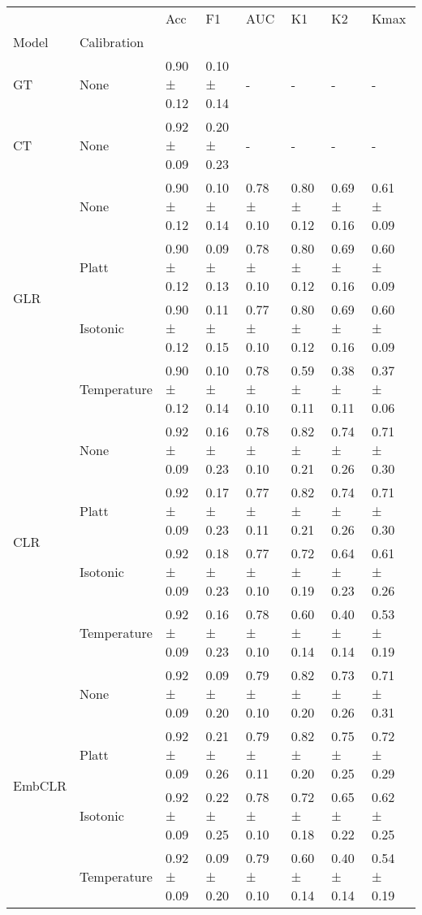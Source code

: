 \begin{tabular}{llllllll}
\toprule
 &  & Acc & F1 & AUC & K1 & K2 & Kmax \\
Model & Calibration &  &  &  &  &  &  \\
\midrule
GT & None & 0.90 ± 0.12 & 0.10 ± 0.14 & - & - & - & - \\
\cline{1-8}
CT & None & 0.92 ± 0.09 & 0.20 ± 0.23 & - & - & - & - \\
\cline{1-8}
\multirow[t]{4}{*}{GLR} & None & 0.90 ± 0.12 & 0.10 ± 0.14 & 0.78 ± 0.10 & 0.80 ± 0.12 & 0.69 ± 0.16 & 0.61 ± 0.09 \\
 & Platt & 0.90 ± 0.12 & 0.09 ± 0.13 & 0.78 ± 0.10 & 0.80 ± 0.12 & 0.69 ± 0.16 & 0.60 ± 0.09 \\
 & Isotonic & 0.90 ± 0.12 & 0.11 ± 0.15 & 0.77 ± 0.10 & 0.80 ± 0.12 & 0.69 ± 0.16 & 0.60 ± 0.09 \\
 & Temperature & 0.90 ± 0.12 & 0.10 ± 0.14 & 0.78 ± 0.10 & 0.59 ± 0.11 & 0.38 ± 0.11 & 0.37 ± 0.06 \\
\cline{1-8}
\multirow[t]{4}{*}{CLR} & None & 0.92 ± 0.09 & 0.16 ± 0.23 & 0.78 ± 0.10 & 0.82 ± 0.21 & 0.74 ± 0.26 & 0.71 ± 0.30 \\
 & Platt & 0.92 ± 0.09 & 0.17 ± 0.23 & 0.77 ± 0.11 & 0.82 ± 0.21 & 0.74 ± 0.26 & 0.71 ± 0.30 \\
 & Isotonic & 0.92 ± 0.09 & 0.18 ± 0.23 & 0.77 ± 0.10 & 0.72 ± 0.19 & 0.64 ± 0.23 & 0.61 ± 0.26 \\
 & Temperature & 0.92 ± 0.09 & 0.16 ± 0.23 & 0.78 ± 0.10 & 0.60 ± 0.14 & 0.40 ± 0.14 & 0.53 ± 0.19 \\
\cline{1-8}
\multirow[t]{4}{*}{EmbCLR} & None & 0.92 ± 0.09 & 0.09 ± 0.20 & 0.79 ± 0.10 & 0.82 ± 0.20 & 0.73 ± 0.26 & 0.71 ± 0.31 \\
 & Platt & 0.92 ± 0.09 & 0.21 ± 0.26 & 0.79 ± 0.11 & 0.82 ± 0.20 & 0.75 ± 0.25 & 0.72 ± 0.29 \\
 & Isotonic & 0.92 ± 0.09 & 0.22 ± 0.25 & 0.78 ± 0.10 & 0.72 ± 0.18 & 0.65 ± 0.22 & 0.62 ± 0.25 \\
 & Temperature & 0.92 ± 0.09 & 0.09 ± 0.20 & 0.79 ± 0.10 & 0.60 ± 0.14 & 0.40 ± 0.14 & 0.54 ± 0.19 \\
\cline{1-8}
\bottomrule
\end{tabular}
